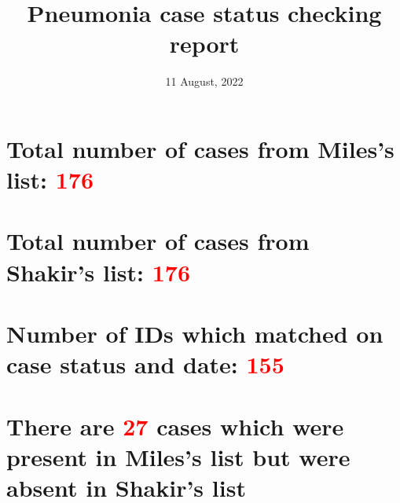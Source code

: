 \documentclass[
]{article}
\title{\textbf{Pneumonia case status checking report}}
\author{}
\date{\vspace{-2.5em}11 August, 2022}
\begin{document}
\maketitle

\hypertarget{total-number-of-cases-from-miless-list}{%
\section{\texorpdfstring{Total number of cases from Miles's list:
\textcolor{red}{176}}{Total number of cases from Miles's list: }}\label{total-number-of-cases-from-miless-list}}

\hypertarget{total-number-of-cases-from-shakirs-list}{%
\section{\texorpdfstring{Total number of cases from Shakir's list:
\textcolor{red}{176}}{Total number of cases from Shakir's list: }}\label{total-number-of-cases-from-shakirs-list}}

\hypertarget{number-of-ids-which-matched-on-case-status-and-date}{%
\section{\texorpdfstring{Number of IDs which matched on case status and
date:
\textcolor{red}{155}}{Number of IDs which matched on case status and date: }}\label{number-of-ids-which-matched-on-case-status-and-date}}

\hypertarget{there-are-cases-which-were-present-in-miless-list-but-were-absent-in-shakirs-list}{%
\section{\texorpdfstring{There are \textcolor{red}{27} cases which were
present in Miles's list but were absent in Shakir's
list}{There are  cases which were present in Miles's list but were absent in Shakir's list}}\label{there-are-cases-which-were-present-in-miless-list-but-were-absent-in-shakirs-list}}
\end{document}
